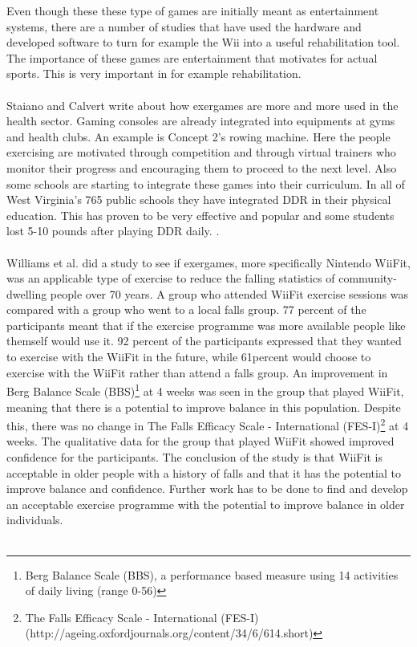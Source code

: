 Even though these these type of games are initially meant as entertainment systems, there are a number of studies that have used the hardware and developed software to turn for example the Wii into a useful rehabilitation tool. The importance of these games are entertainment that motivates for actual sports. This is very important in for example rehabilitation. \cite{taylor2011activity} \\ \\
Staiano and Calvert write about how exergames are more and more used in the health sector. Gaming consoles are already integrated into equipments at gyms and health clubs. An example is Concept 2’s rowing machine. Here the people exercising are motivated through competition and through virtual trainers who monitor their progress and encouraging them to proceed to the next level. Also some schools are starting to integrate these games into their curriculum. In all of West Virginia’s 765 public schools they have integrated DDR in their physical education. This has proven to be very effective and popular and some students lost 5-10 pounds after playing DDR daily. \cite{staiano2011exergames}. \\ \\
Williams et al. did a study to see if exergames, more specifically Nintendo WiiFit, was an applicable type of exercise to reduce the falling statistics of community-dwelling people over 70 years. A group who attended WiiFit exercise sessions was compared with a group who went to a local falls group. 77 percent of the participants meant that if the exercise programme was more available people like themself would use it. 92 percent of the participants expressed that they wanted to exercise with the WiiFit in the future, while 61percent would choose to exercise with the WiiFit rather than attend a falls group. An improvement in Berg Balance Scale (BBS)\footnote{Berg Balance Scale (BBS), a performance based measure using 14 activities of daily living (range 0-56)\cite{excell}} at 4 weeks was seen in the group that played WiiFit, meaning that there is a potential to improve balance in this population. Despite this, there was no change in The Falls Efficacy Scale - International (FES-I)\footnote{The Falls Efficacy Scale - International (FES-I) (http://ageing.oxfordjournals.org/content/34/6/614.short)} at 4 weeks. The qualitative data for the group that played WiiFit showed improved confidence for the participants. The conclusion of the study is that WiiFit is acceptable in  older people with a history of falls and that it has the potential to improve balance and confidence. Further work has to be done to find and develop an acceptable exercise programme with the potential to improve balance in older individuals. \cite{excell}\\ \\
